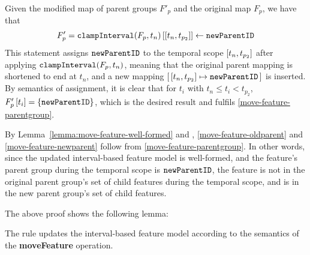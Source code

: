 Given the modified map of parent groups $F'_p$ and the original map $F_p$, we have that
\[
   F'_p = \lookup{\var{clampInterval}(F_p, t_n)}{\interval{t_n}{t_{p_2}}} \assign \var{newParentID}
\]
This statement assigns $\texttt{newParentID}$ to the temporal scope $\interval{t_n}{t_{p_2}}$ after applying $\texttt{clampInterval}(F_p, t_n)$, meaning that the original parent mapping is shortened to end at $t_n$, and a new mapping $\intervalmapping{t_n}{t_{p_2}}{\var{newParentID}}$ is inserted. By semantics of assignment, it is clear that for $t_i$ with $t_n \leq t_i < t_{p_2}$, $F'_p \left[ t_i \right] = \left\{\texttt{newParentID}\right\}$, which is the desired result and fulfils \ref{move-feature-parentgroup}.

By Lemma~\vref{lemma:move-feature-well-formed} and , \ref{move-feature-oldparent} and \ref{move-feature-newparent} follow from \ref{move-feature-parentgroup}. In other words, since the updated interval-based feature model is well-formed, and the feature's parent group during the temporal scope is $\texttt{newParentID}$, the feature is not in the original parent group's set of child features during the temporal scope, and is in the new parent group's set of child features.

The above proof shows the following lemma:
\\

\begin{lemma}
   The  rule updates the interval-based feature model according to the semantics of the \textbf{moveFeature} operation.
   \label{lemma:move-feature-mod}
\end{lemma}

